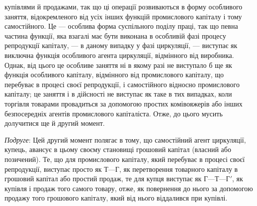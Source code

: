 \parcont{}  %
купівлями й продажами, так що ці операції розвиваються в форму
особливого заняття, відокремленого від усіх інших функцій промислового капіталу і тому самостійного.
Це — особлива форма
суспільного поділу праці, так що певна частина функції, яка
взагалі має бути виконана в особливій фазі процесу репродукції
капіталу, — в даному випадку у фазі циркуляції, — виступає як
виключна функція особливого агента циркуляції, відмінного від
виробника. Однак, від цього це особливе заняття ні в якому
разі не виступало б ще як функція особливого капіталу, відмінного від промислового капіталу, що
перебуває в процесі своєї
репродукції, і самостійного відносно промислового капіталу; це
заняття і в дійсності не виступає як таке в тих випадках, коли
торгівля товарами провадиться за допомогою простих комівояжерів або інших безпосередніх агентів
промислового капіталіста.
Отже, до цього мусить долучитися ще й другий момент.

\emph{Подруге}: Цей другий момент полягає в тому, що самостійний агент циркуляції, купець, авансує в цьому
своєму становищі грошовий капітал (власний або позичений). Те, що для промислового капіталу, який
перебуває в процесі своєї репродукції, виступає просто як $Т — Г$, як перетворення товарного
капіталу в грошовий капітал або простий продаж, те для купця
виступає як $Г — Т — Г'$, як купівля і продаж того самого товару,
отже, як повернення до нього за допомогою продажу того грошового капіталу, який від нього віддалився
при купівлі.

